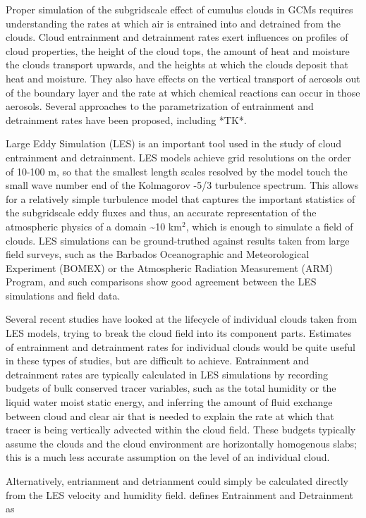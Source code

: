 \documentclass[12pt]{article}
\begin{document}
Proper simulation of the subgridscale effect of cumulus clouds in
GCMs requires understanding the rates at which air is entrained into
and detrained from the clouds. Cloud entrainment and detrainment rates
exert influences on profiles of cloud properties, the height of the
cloud tops, the amount of heat and moisture the clouds transport upwards,
and the heights at which the clouds deposit that heat and moisture.
They also have effects on the vertical transport of aerosols out of
the boundary layer and the rate at which chemical reactions can occur
in those aerosols. Several approaches to the parametrization of entrainment
and detrainment rates have been proposed, including *TK*.

Large Eddy Simulation (LES) is an important tool used in the study
of cloud entrainment and detrainment. LES models achieve grid resolutions
on the order of 10-100 m, so that the smallest length scales resolved
by the model touch the small wave number end of the Kolmagorov -5/3
turbulence spectrum. This allows for a relatively simple turbulence
model that captures the important statistics of the subgridscale eddy
fluxes and thus, an accurate representation of the atmospheric physics
of a domain \textasciitilde{}10 km$^{2}$, which is enough to simulate
a field of clouds. LES simulations can be ground-truthed against results
taken from large field surveys, such as the Barbados Oceanographic
and Meteorological Experiment (BOMEX) or the Atmospheric Radiation
Measurement (ARM) Program, and such comparisons show good agreement
between the LES simulations and field data.

Several recent studies have looked at the lifecycle of individual
clouds taken from LES models, trying to break the cloud field into
its component parts. Estimates of entrainment and detrainment rates
for individual clouds would be quite useful in these types of studies,
but are difficult to achieve. Entrainment and detrainment rates are 
typically calculated in LES simulations by recording budgets
of bulk conserved tracer variables, such as the total humidity or
the liquid water moist static energy, and inferring the amount of
fluid exchange between cloud and clear air that is needed to explain
the rate at which that tracer is being vertically advected within
the cloud field. These budgets typically assume the clouds and the
cloud environment are horizontally homogenous slabs; this is a much
less accurate assumption on the level of an individual cloud.

Alternatively, entrianment and detrianment could simply be calculated
directly from the LES velocity and humidity field.  \cite{Siebesma1998} 
defines Entrainment and Detrainment as
\end{document}

